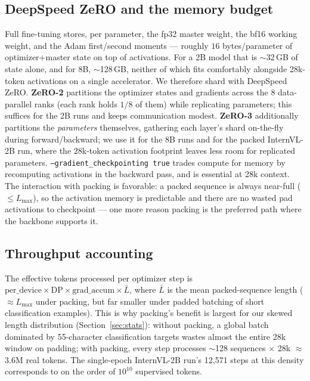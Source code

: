 \documentclass[11pt,a4paper]{article}
\begin{document}
\subsection{DeepSpeed ZeRO and the memory budget}
Full fine-tuning stores, per parameter, the fp32 master weight, the bf16 working weight, and the Adam first/second moments --- roughly $16$ bytes/parameter of optimizer+master state on top of activations. For a 2B model that is $\sim$32\,GB of state alone, and for 8B, $\sim$128\,GB, neither of which fits comfortably alongside 28k-token activations on a single accelerator. We therefore shard with DeepSpeed ZeRO. \textbf{ZeRO-2} partitions the optimizer states and gradients across the 8 data-parallel ranks (each rank holds $1/8$ of them) while replicating parameters; this suffices for the 2B runs and keeps communication modest. \textbf{ZeRO-3} additionally partitions the \emph{parameters} themselves, gathering each layer's shard on-the-fly during forward/backward; we use it for the 8B runs and for the packed InternVL-2B run, where the 28k-token activation footprint leaves less room for replicated parameters. \texttt{--gradient\_checkpointing true} trades compute for memory by recomputing activations in the backward pass, and is essential at 28k context. The interaction with packing is favorable: a packed sequence is always near-full ($\le L_{\max}$), so the activation memory is predictable and there are no wasted pad activations to checkpoint --- one more reason packing is the preferred path where the backbone supports it.

\subsection{Throughput accounting}
The effective tokens processed per optimizer step is $\text{per\_device} \times \text{DP} \times \text{grad\_accum} \times \bar{L}$, where $\bar{L}$ is the mean packed-sequence length ($\approx L_{\max}$ under packing, but far smaller under padded batching of short classification examples). This is why packing's benefit is largest for our skewed length distribution (Section~\ref{sec:stats}): without packing, a global batch dominated by 55-character classification targets wastes almost the entire 28k window on padding; with packing, every step processes $\sim$128 sequences $\times$ 28k $\approx$ 3.6M real tokens. The single-epoch InternVL-2B run's 12{,}571 steps at this density corresponds to on the order of $10^{10}$ supervised tokens.

\end{document}
